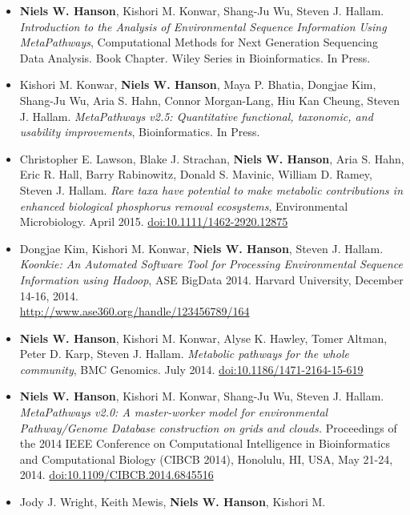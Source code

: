 \documentclass[print]{hanson_cv} %
\begin{document}
\begin{itemize}
\item
  \textbf{Niels W. Hanson}, Kishori M. Konwar, Shang-Ju Wu, Steven J. Hallam. \emph{Introduction to the Analysis of Environmental Sequence Information Using MetaPathways}, Computational Methods for Next Generation Sequencing Data Analysis. Book Chapter. Wiley Series in Bioinformatics. In Press.
\item
Kishori M. Konwar, \textbf{Niels W. Hanson}, Maya P. Bhatia, Dongjae Kim, Shang-Ju Wu, Aria S. Hahn, Connor Morgan-Lang, Hiu Kan Cheung, Steven J. Hallam. \emph{MetaPathways v2.5: Quantitative functional, taxonomic, and usability improvements}, Bioinformatics. In Press. 

\item
  Christopher E. Lawson, Blake J. Strachan, \textbf{Niels W. Hanson}, Aria S. Hahn, Eric R. Hall, Barry Rabinowitz, Donald S. Mavinic, William D. Ramey, Steven J. Hallam. \emph{Rare taxa have potential to make metabolic contributions in enhanced biological phosphorus removal ecosystems}, Environmental Microbiology. April 2015. \href{http://dx.doi.org/10.1111/1462-2920.12875}{doi:10.1111/1462-2920.12875} 
\item
  Dongjae Kim, Kishori M. Konwar, \textbf{Niels W. Hanson}, Steven J.
  Hallam. \emph{Koonkie: An Automated Software Tool for Processing
  Environmental Sequence Information using Hadoop}, ASE BigData 2014.
  Harvard University, December 14-16,
  2014.\\\href{http://www.ase360.org/handle/123456789/164}{http://www.ase360.org/handle/123456789/164}
\item
  \textbf{Niels W. Hanson}, Kishori M. Konwar, Alyse K. Hawley, Tomer
  Altman, Peter D. Karp, Steven J. Hallam. \emph{Metabolic pathways for
  the whole community}, BMC Genomics. July 2014.
  \href{http://dx.doi.org/10.1186/1471-2164-15-619}{doi:10.1186/1471-2164-15-619}
\item
  \textbf{Niels W. Hanson}, Kishori M. Konwar, Shang-Ju Wu, Steven J.
  Hallam. \emph{MetaPathways v2.0: A master-worker model for
  environmental Pathway/Genome Database construction on grids and
  clouds.} Proceedings of the 2014 IEEE Conference on Computational
  Intelligence in Bioinformatics and Computational Biology (CIBCB 2014),
  Honolulu, HI, USA, May 21-24, 2014.
  \href{http://ieeexplore.ieee.org/xpl/articleDetails.jsp?arnumber=6845516}{doi:10.1109/CIBCB.2014.6845516}
\item
  Jody J. Wright, Keith Mewis, \textbf{Niels W. Hanson}, Kishori M.

\end{itemize}
\end{document}
